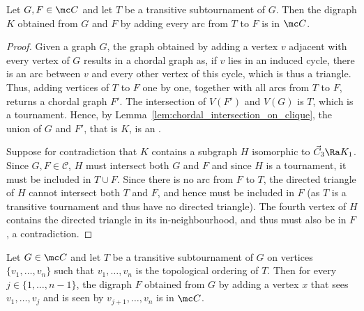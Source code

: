 \begin{lemma}\label{lem:directedsum}
Let $G, F \in \mc C$ and let $T$ be a transitive subtournament of $G$. Then the digraph $K$ obtained from $G$ and $F$ by adding every arc from $T$ to $F$ is in $\mc C$. 
\end{lemma}

\begin{proof}
 Given a graph $G$, the graph obtained by adding a vertex $v$ adjacent with every vertex of $G$ results in a chordal graph  as, if $v$ lies in an induced cycle, there is an arc between $v$ and every other vertex of this cycle, which is thus a triangle.
 Thus, adding vertices of $T$ to $F$ one by one, together with all arcs from $T$ to $F$, returns a chordal graph $F'$. The intersection of $V(F')$ and  $V(G)$ is $T$, which is a tournament. Hence, by Lemma~\ref{lem:chordal_intersection_on_clique}, the union of $G$ and $F'$, that is $K$, is an \ocg.

Suppose for contradiction that $K$ contains a subgraph $H$ isomorphic to  $\vec C_3 \Ra K_1$.
Since $G, F \in \mathcal C$, $H$ must intersect both $G$ and $F$ and since $H$ is a tournament, it must be included in $T \cup F$. 
Since there is no arc from $F$ to $T$, the directed triangle of $H$ cannot intersect both $T$ and $F$, and hence must be included in $F$ (as $T$ is a transitive tournament and thus have no directed triangle). The fourth vertex of $H$ contains the directed triangle in its in-neighbourhood, and thus must also be in $F$, a contradiction.  

\end{proof}


\begin{lemma}\label{lem:add_vertex_TT}
Let $G \in \mc C$ and let $T$ be a transitive subtournament of $G$ on vertices $\{v_1, \dots, v_n\}$ such that $v_1, \dots, v_n$  is the topological ordering of $T$. 
Then for every $j \in \{1, \dots, n-1\}$, the digraph $F$ obtained from $G$ by adding a vertex $x$ that sees $v_1, \dots, v_j$ and is seen by $v_{j+1}, \dots, v_n$ is in $\mc C$. 
\end{lemma}

